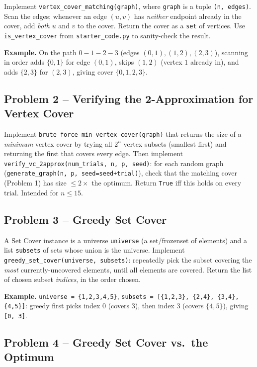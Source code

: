 \documentclass[11pt]{article}
\begin{document}
Implement \texttt{vertex\_cover\_matching(graph)}, where \texttt{graph} is a tuple
\texttt{(n, edges)}. Scan the edges; whenever an edge $(u,v)$ has \emph{neither} endpoint
already in the cover, add \emph{both} $u$ and $v$ to the cover. Return the cover as a
\texttt{set} of vertices. Use \texttt{is\_vertex\_cover} from \texttt{starter\_code.py} to
sanity-check the result.

\textbf{Example.} On the path $0 - 1 - 2 - 3$ (edges $(0,1),(1,2),(2,3)$), scanning in
order adds $\{0,1\}$ for edge $(0,1)$, skips $(1,2)$ (vertex $1$ already in), and adds
$\{2,3\}$ for $(2,3)$, giving cover $\{0,1,2,3\}$.

\subsection*{Problem 2 -- Verifying the 2-Approximation for Vertex Cover}

Implement \texttt{brute\_force\_min\_vertex\_cover(graph)} that returns the size of a
\emph{minimum} vertex cover by trying all $2^n$ vertex subsets (smallest first) and
returning the first that covers every edge. Then implement
\texttt{verify\_vc\_2approx(num\_trials, n, p, seed)}: for each random graph
(\texttt{generate\_graph(n, p, seed=seed+trial)}), check that the matching cover (Problem
1) has size $\le 2\times$ the optimum. Return \texttt{True} iff this holds on every trial.
Intended for $n \le 15$.

\subsection*{Problem 3 -- Greedy Set Cover}

A Set Cover instance is a universe \texttt{universe} (a set/frozenset of elements) and a
list \texttt{subsets} of sets whose union is the universe. Implement
\texttt{greedy\_set\_cover(universe, subsets)}: repeatedly pick the subset covering the
\emph{most} currently-uncovered elements, until all elements are covered. Return the list
of chosen subset \emph{indices}, in the order chosen.

\textbf{Example.} \texttt{universe = \{1,2,3,4,5\}}, \texttt{subsets = [\{1,2,3\}, \{2,4\},
\{3,4\}, \{4,5\}]}: greedy first picks index $0$ (covers $3$), then index $3$ (covers
$\{4,5\}$), giving \texttt{[0, 3]}.

\subsection*{Problem 4 -- Greedy Set Cover vs.\ the Optimum}
\end{document}
